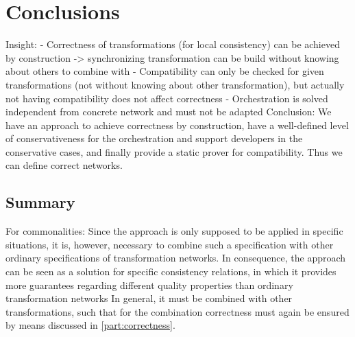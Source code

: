 \chapter{Conclusions
}

Insight:
- Correctness of transformations (for local consistency) can be achieved by construction -> synchronizing transformation can be build without knowing about others to combine with
- Compatibility can only be checked for given transformations (not without knowing about other transformation), but actually not having compatibility does not affect correctness
- Orchestration is solved independent from concrete network and must not be adapted
Conclusion: We have an approach to achieve correctness by construction, have a well-defined level of conservativeness for the orchestration and support developers in the conservative cases, and finally provide a static prover for compatibility. Thus we can define correct networks.

\section{Summary}

For commonalities:
Since the approach is only supposed to be applied in specific situations, it is, however, necessary to combine such a specification with other ordinary specifications of transformation networks.
In consequence, the \commonalities approach can be seen as a solution for specific consistency relations, in which it provides more guarantees regarding different quality properties than ordinary transformation networks
In general, it must be combined with other transformations, such that for the combination correctness must again be ensured by means discussed in \autoref{part:correctness}. 


